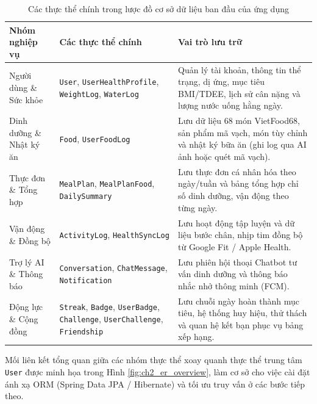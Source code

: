 \documentclass[../main.tex]{subfiles}
\begin{document}
\begin{table}[H]
    \centering
    \caption{Các thực thể chính trong lược đồ cơ sở dữ liệu ban đầu của ứng dụng}
    \label{tab:ch2_initial_entities}
    \begin{tabular}{|p{}|p{}|p{}|}
        \hline
        \rowcolor{primary!35}
        \textbf{Nhóm nghiệp vụ} & \textbf{Các thực thể chính} & \textbf{Vai trò lưu trữ} \\
        \hline
        Người dùng \& Sức khỏe & \texttt{User}, \texttt{UserHealthProfile}, \texttt{WeightLog}, \texttt{WaterLog} & Quản lý tài khoản, thông tin thể trạng, dị ứng, mục tiêu BMI/TDEE, lịch sử cân nặng và lượng nước uống hằng ngày. \\
        \hline
        Dinh dưỡng \& Nhật ký ăn & \texttt{Food}, \texttt{UserFoodLog} & Lưu dữ liệu 68 món VietFood68, sản phẩm mã vạch, món tùy chỉnh và nhật ký bữa ăn (ghi log qua AI ảnh hoặc quét mã vạch). \\
        \hline
        Thực đơn \& Tổng hợp & \texttt{MealPlan}, \texttt{MealPlanFood}, \texttt{DailySummary} & Lưu thực đơn cá nhân hóa theo ngày/tuần và bảng tổng hợp chỉ số dinh dưỡng, vận động theo từng ngày. \\
        \hline
        Vận động \& Đồng bộ & \texttt{ActivityLog}, \texttt{HealthSyncLog} & Lưu hoạt động tập luyện và dữ liệu bước chân, nhịp tim đồng bộ từ Google Fit / Apple Health. \\
        \hline
        Trợ lý AI \& Thông báo & \texttt{Conversation}, \texttt{ChatMessage}, \texttt{Notification} & Lưu phiên hội thoại Chatbot tư vấn dinh dưỡng và thông báo nhắc nhở thông minh (FCM). \\
        \hline
        Động lực \& Cộng đồng & \texttt{Streak}, \texttt{Badge}, \texttt{UserBadge}, \texttt{Challenge}, \texttt{UserChallenge}, \texttt{Friendship} & Lưu chuỗi ngày hoàn thành mục tiêu, hệ thống huy hiệu, thử thách và quan hệ kết bạn phục vụ bảng xếp hạng. \\
        \hline
    \end{tabular}
\end{table}

Mối liên kết tổng quan giữa các nhóm thực thể xoay quanh thực thể trung tâm \texttt{User} được minh họa trong Hình \ref{fig:ch2_er_overview}, làm cơ sở cho việc cài đặt ánh xạ ORM (Spring Data JPA / Hibernate) và tối ưu truy vấn ở các bước tiếp theo.
\end{document}

